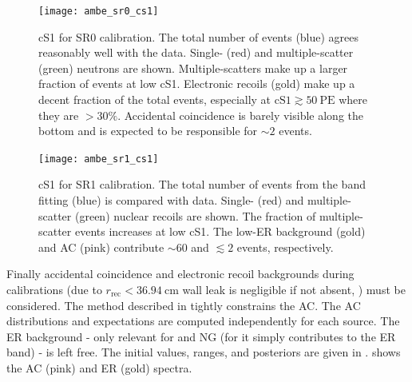 \begin{figure}
\centering
\texttt{[image: ambe\_sr0\_cs1]}
\caption{cS1 for SR0 \ambe calibration.  The total number of events (blue) agrees reasonably well with the data.  Single- (red) and
multiple-scatter (green) neutrons are shown.  Multiple-scatters make up a larger fraction of events
at low cS1.  Electronic recoils (gold) make up a decent fraction of the total events, especially at $\mathrm{cS1} \gtrsim 50\ \mathrm{PE}$
where they are $> 30\%$.  Accidental coincidence is barely visible along the bottom and is expected to be responsible for ${\sim}2$
events.}
\label{fig:er_nr_calibrations_results_ambe_sr0_cs1}
\end{figure}

\begin{figure}
\centering
\texttt{[image: ambe\_sr1\_cs1]}
\caption{cS1 for SR1 \ambe calibration.  The total number of events from the band fitting (blue) is compared with data.  Single- (red)
and multiple-scatter (green) nuclear recoils are shown.  The fraction of multiple-scatter events increases at low cS1.  The low-ER
background (gold) and AC (pink) contribute ${\sim}60$ and $\lesssim 2$ events, respectively.}
\label{fig:er_nr_calibrations_results_ambe_sr1_cs1}
\end{figure}

Finally accidental coincidence and electronic recoil backgrounds during calibrations (due to
$r_{\mathrm{rec}} < 36.94\ \mathrm{cm}$ wall leak is negligible if not absent,
) must be considered.  The method
described in  tightly constrains the AC.  The AC
distributions and expectations are computed independently for each source.  The ER background - only relevant for \ambe and NG
(for  it simply contributes to the ER band) - is left free.  The initial values, ranges, and posteriors are given in
.   shows the AC (pink) and ER
(gold) spectra.

